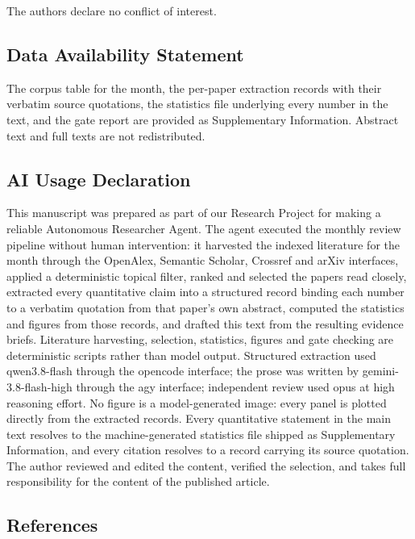\documentclass[
  11pt,
]{article}
\begin{document}
The authors declare no conflict of interest.

\subsection{Data Availability
Statement}\label{data-availability-statement}

The corpus table for the month, the per-paper extraction records with
their verbatim source quotations, the statistics file underlying every
number in the text, and the gate report are provided as Supplementary
Information. Abstract text and full texts are not redistributed.

\subsection{AI Usage Declaration}\label{ai-usage-declaration}

This manuscript was prepared as part of our Research Project for making
a reliable Autonomous Researcher Agent. The agent executed the monthly
review pipeline without human intervention: it harvested the indexed
literature for the month through the OpenAlex, Semantic Scholar,
Crossref and arXiv interfaces, applied a deterministic topical filter,
ranked and selected the papers read closely, extracted every
quantitative claim into a structured record binding each number to a
verbatim quotation from that paper's own abstract, computed the
statistics and figures from those records, and drafted this text from
the resulting evidence briefs. Literature harvesting, selection,
statistics, figures and gate checking are deterministic scripts rather
than model output. Structured extraction used qwen3.8-flash through the
opencode interface; the prose was written by gemini-3.8-flash-high
through the agy interface; independent review used opus at high
reasoning effort. No figure is a model-generated image: every panel is
plotted directly from the extracted records. Every quantitative
statement in the main text resolves to the machine-generated statistics
file shipped as Supplementary Information, and every citation resolves
to a record carrying its source quotation. The author reviewed and
edited the content, verified the selection, and takes full
responsibility for the content of the published article.

\subsection{References}\label{references}
\end{document}
